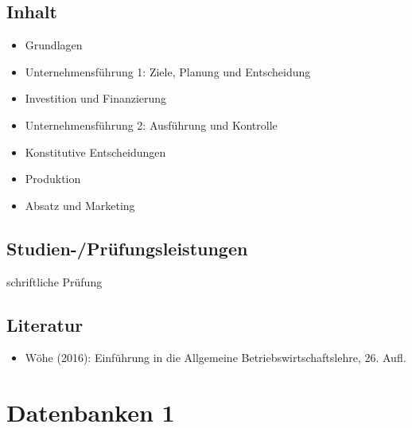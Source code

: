 \section*{Inhalt\label{/mi-2017/modulbeschreibungen-bachelor/BA_BWL1}}\label{inhaltpathlabelmi-2017modulbeschreibungen-bachelorbaux5fbwl1}

\begin{itemize}
\tightlist
\item
  Grundlagen
\item
  Unternehmensführung 1: Ziele, Planung und Entscheidung
\item
  Investition und Finanzierung
\item
  Unternehmensführung 2: Ausführung und Kontrolle
\item
  Konstitutive Entscheidungen
\item
  Produktion
\item
  Absatz und Marketing
\end{itemize}

\section*{Studien-/Prüfungsleistungen\label{/mi-2017/modulbeschreibungen-bachelor/BA_BWL1}}\label{studien-pruxfcfungsleistungenpathlabelmi-2017modulbeschreibungen-bachelorbaux5fbwl1}

schriftliche Prüfung

\section*{Literatur\label{/mi-2017/modulbeschreibungen-bachelor/BA_BWL1}}\label{literaturpathlabelmi-2017modulbeschreibungen-bachelorbaux5fbwl1}

\begin{itemize}
\tightlist
\item
  Wöhe (2016): Einführung in die Allgemeine Betriebswirtschaftslehre,
  26. Aufl.
\end{itemize}

\chapter{Datenbanken
1\label{/mi-2017/modulbeschreibungen-bachelor/BA_Datenbanken1}}\label{datenbanken-1pathlabelmi-2017modulbeschreibungen-bachelorbaux5fdatenbanken1}

